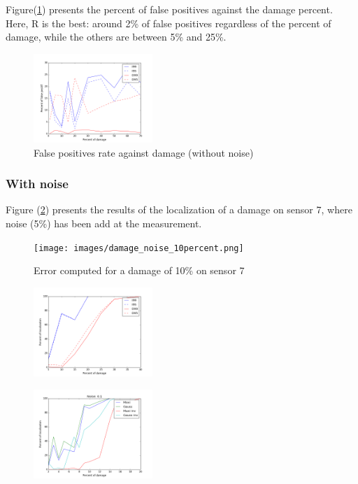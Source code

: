 \documentclass[journal]{IEEEtran}
\begin{document}
Figure(\ref{fp}) presents the percent of false positives against the damage percent. Here, R is the best: around 2\% of false positives regardless of the percent of damage, while the others are between 5\% and 25\%.


\begin{figure}[h!]
  \centering
  \includegraphics[width=0.4\textwidth]{images/fp.png}
  \caption{False positives rate against damage (without noise)}
  \label{fp}
\end{figure}



\subsubsection{With noise}



Figure (\ref{itp_error_noise}) presents the results of the localization of a damage on sensor 7, where noise (5\%) has been add at the measurement.


\begin{figure}[h!]
  \centering
  \texttt{[image: images/damage\_noise\_10percent.png]}
  \caption{Error computed for a damage of 10\% on sensor 7}
  \label{itp_error_noise}
\end{figure}




\begin{figure}[h!]
  \centering
  \includegraphics[width=0.4\textwidth]{images/detect_noise004.png}
  \caption{}
  \label{detect_5noise}
\end{figure}


\begin{figure}[h!]
  \centering
  \includegraphics[width=0.4\textwidth]{images/detect_curve_with_01noise.png}
  \caption{}
  \label{detect_10noise}
\end{figure}
\end{document}
